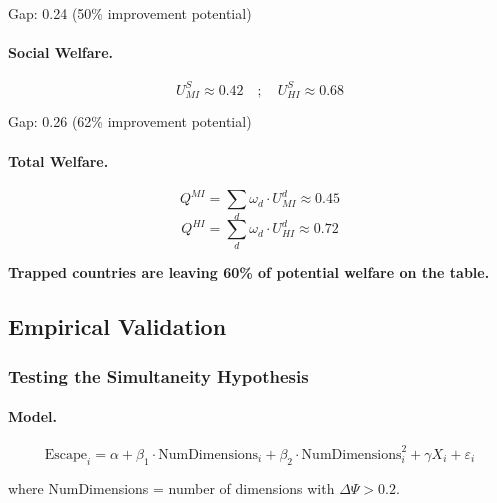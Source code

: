 Gap: 0.24 (50\% improvement potential)

\paragraph{Social Welfare.}
\begin{equation}
U^S_{MI} \approx 0.42 \quad ; \quad U^S_{HI} \approx 0.68
\end{equation}

Gap: 0.26 (62\% improvement potential)

\paragraph{Total Welfare.}
\begin{equation}
Q^{MI} = \sum_d \omega_d \cdot U^d_{MI} \approx 0.45
\end{equation}
\begin{equation}
Q^{HI} = \sum_d \omega_d \cdot U^d_{HI} \approx 0.72
\end{equation}

\textbf{Trapped countries are leaving 60\% of potential welfare on the table.}

\subsection{Empirical Validation}

\subsubsection{Testing the Simultaneity Hypothesis}

\paragraph{Model.}
\begin{equation}
\text{Escape}_i = \alpha + \beta_1 \cdot \text{NumDimensions}_i + \beta_2 \cdot \text{NumDimensions}^2_i + \gamma X_i + \varepsilon_i
\end{equation}

where NumDimensions = number of dimensions with $\Delta \Psi > 0.2$.

